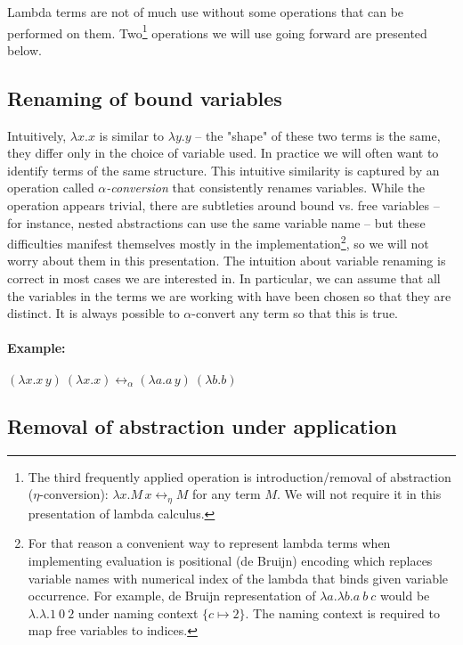 \documentclass[11pt,twoside,a4paper]{article} %
\begin{document}
Lambda terms are not of much use without some operations that can be performed
on them. Two\footnote{The third frequently applied operation is introduction/removal 
of abstraction ($\eta$-conversion): $\lambda x.M\,x\longleftrightarrow_\eta M$ for 
any term $M$. We will not require it in this presentation of lambda calculus.} 
operations we will use going forward are presented below.

\subsection{Renaming of bound variables}

Intuitively, $\lambda x.x$ is similar to $\lambda y.y$ -- the "shape" of these
two terms is the same, they differ only in the choice of variable used. In 
practice we will often want to identify terms of the same structure. 
This intuitive similarity is captured by an operation called 
\emph{$\alpha$-conversion} that consistently renames variables. While the
operation appears trivial, there are subtleties around bound vs. free
variables -- for instance, nested abstractions can use the same variable name
-- but these difficulties manifest themselves mostly in the
implementation\footnote{For that reason a convenient way to represent 
lambda terms when implementing evaluation is positional (de Bruijn) encoding
which replaces variable names with numerical index of the lambda that binds given 
variable occurrence. For example, de Bruijn representation of 
$\lambda a.\lambda b.a\ b\ c$  would be $\lambda.\lambda.1\ 0\ 2$ under naming 
context $\{c\mapsto 2\}$.  The naming context is required to map free variables 
to indices.}, so we will not worry about them in this presentation. The intuition 
about variable renaming is correct in most cases we are interested in. In 
particular, we can assume that all the variables in the terms we are working 
with have been chosen so that they are distinct. It is always possible to 
$\alpha$-convert any term so that this is true.
\paragraph{Example:} $(\lambda x.x\,y)\ (\lambda x.x)\longleftrightarrow_\alpha(\lambda
a.a\,y)\ (\lambda b.b)$

\subsection{Removal of abstraction under application}
\end{document}

